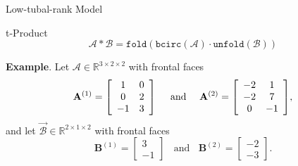 \documentclass[t, 10pt, handout, aspectratio=169]{beamer}
\begin{document}



\begin{frame}{Low-tubal-rank Model}
\begin{block}{t-Product}
$$\mathcal{A}*\mathcal{B}=\texttt{fold}(\texttt{bcirc}(\mathcal{A})\cdot\texttt{unfold}(\mathcal{B}))$$
\end{block}
\textbf{Example}. Let $\mathcal{A}\in\mathbb{R}^{3\times 2 \times 2}$ with frontal faces
$$
\mathbf{A}^{(1)}=\left[
\begin{array}{c c}
  1 & 0 \\
  0 & 2 \\
  -1 & 3
\end{array}
\right]~~~~
\text{and}~~~~\mathbf{A}^{(2)}=\mleft[
\begin{array}{c c}
  -2 & 1 \\
  -2 & 7 \\
  0 & -1
\end{array}
\mright],
$$
and let $\vec{\mathcal{B}}\in\mathbb{R}^{2\times 1 \times 2}$ with frontal faces
$$
\mathbf{B}^{(1)}=
\left[\begin{matrix}
3\\
-1
\end{matrix}\right]
~~~~\text{and}~~~~
\mathbf{B}^{(2)}=
\left[\begin{matrix}
-2\\
-3
\end{matrix}\right].
$$
\end{frame}
\end{document}
